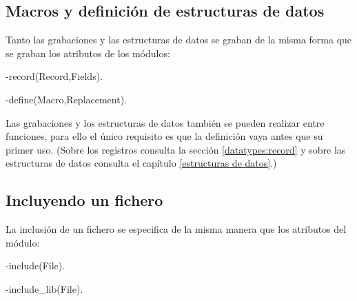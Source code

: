 \subsection{Macros y definici\'on de estructuras de datos}

Tanto las grabaciones y las estructuras de datos se graban de la misma forma que se graban los atributos de los m\'odulos: 

\begin{erlang}
-record(Record,Fields).

-define(Macro,Replacement).
\end{erlang}
Las grabaciones y los estructuras de datos tambi\'en se pueden realizar entre funciones, para ello el \'unico requisito es que la definici\'on vaya antes que su primer uso. (Sobre los registros consulta la secci\'on \ref{datatypes:record} y sobre las estructuras de datos consulta el cap\'itulo \ref{estructuras de datos}.)

\subsection{Incluyendo un fichero}

La inclusi\'on de un fichero se especifica de la misma manera que los atributos del m\'odulo: 

\begin{erlang}
-include(File).

-include_lib(File).
\end{erlang}

